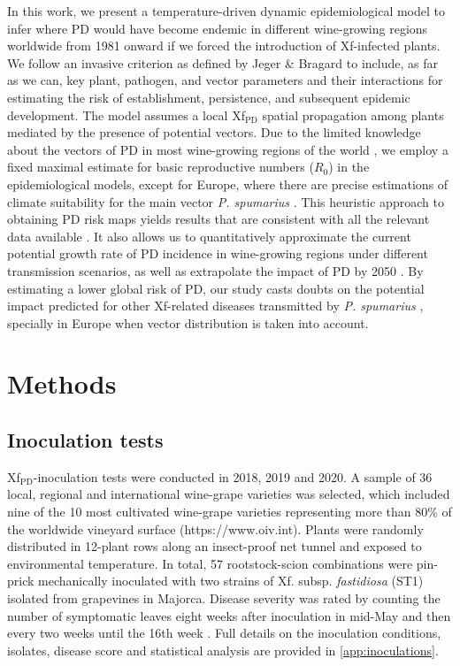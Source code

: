 In this work, we present a temperature-driven dynamic epidemiological model to
infer where PD would have become endemic in different wine-growing regions
worldwide from 1981 onward if we forced the introduction of Xf-infected plants.
We follow an invasive criterion as defined by Jeger \& Bragard \cite{Jeger2019}
to include, as far as we can, key plant, pathogen, and vector parameters and
their interactions for estimating the risk of establishment, persistence, and
subsequent epidemic development. The model assumes a local Xf$_{\textrm{PD}}$
spatial propagation among plants mediated by the presence of potential vectors.
Due to the limited knowledge about the vectors of PD in most wine-growing
regions of the world \cite{Redak2004}, we employ a fixed maximal estimate for
basic reproductive numbers ($R_0$) in the epidemiological models, except for
Europe, where there are precise estimations of climate suitability for the main
vector \textit{P. spumarius} \cite{Godefroid2021}. This heuristic approach to
obtaining PD risk maps yields results that are consistent with all the relevant
data available \cite{Bragard2019}. It also allows us to quantitatively
approximate the current potential growth rate of PD incidence in wine-growing
regions under different transmission scenarios, as well as extrapolate the
impact of PD by 2050 \cite{Webpage}. By estimating a lower global risk of PD,
our study casts doubts on the potential impact predicted for other Xf-related
diseases transmitted by \textit{P. spumarius} \cite{Schneider2020}, specially
in Europe when vector distribution is taken into account.

\section{Methods}
\subsection{Inoculation tests}

Xf$_{\textrm{PD}}$-inoculation tests were
conducted in 2018, 2019 and 2020. A sample of 36 local, regional and
international wine-grape varieties was selected, which included nine of the
10 most cultivated wine-grape varieties representing more than 80\% of the
worldwide vineyard surface (https://www.oiv.int). Plants were randomly
distributed in 12-plant rows along an insect-proof net tunnel and exposed
to environmental temperature. In total, 57 rootstock-scion combinations were
pin-prick mechanically inoculated \cite{Almeida2003} with two strains of
Xf. subsp. \textit{fastidiosa} (ST1) isolated from grapevines in Majorca.
Disease severity was rated by counting the number of symptomatic leaves eight
weeks after inoculation in mid-May and then every two weeks until the 16th week
\cite{Moralejo2019}. Full details on the inoculation conditions, isolates,
disease score and statistical analysis are provided in \cref{app:inoculations}.

